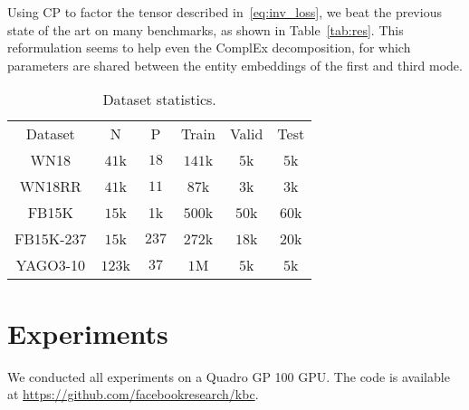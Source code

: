 \documentclass{article}
\newcommand{\CP}{{CP}\xspace}
\newcommand{\complex}{{ComplEx}\xspace}
\newcommand{\fb}{{FB15K}\xspace}
\newcommand{\fbd}{{FB15K-237}\xspace}
\newcommand{\wn}{{WN18}\xspace}
\newcommand{\wnrr}{{WN18RR}\xspace}
\newcommand{\yago}{{YAGO3-10}\xspace}
\begin{document}
Using \CP to factor the tensor described in~\eqref{eq:inv_loss}, we beat the previous state of the art on many benchmarks, as shown in Table~\ref{tab:res}. This reformulation seems to help even the \complex decomposition, for which parameters are shared between the entity embeddings of the first and third mode.

\begin{table}[t]
\centering
\begin{tabular}{cccccc}
\toprule
Dataset & N & P & Train & Valid & Test \\
\wn & $41$k & $18$ & $141$k & $5$k & $5$k \\
\wnrr & $41$k & $11$ & $87$k & $3$k & $3$k \\
\fb & $15$k & 1k & $500$k & $50$k & $60$k \\
\fbd & $15$k & $237$ & $272$k & $18$k & $20$k \\
\yago & $123$k & $37$ & $1$M & $5$k & $5$k \\
\bottomrule
\end{tabular}
\caption{Dataset statistics.}
\label{tab:stats}
\end{table}


\section{Experiments}
We conducted all experiments on a Quadro GP 100 GPU. The code is available at \url{https://github.com/facebookresearch/kbc}. 
\end{document}
